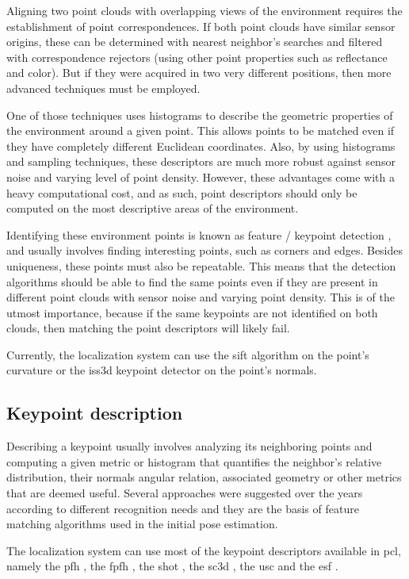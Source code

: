 Aligning two point clouds with overlapping views of the environment requires the establishment of point correspondences. If both point clouds have similar sensor origins, these can be determined with nearest neighbor's searches and filtered with correspondence rejectors (using other point properties such as reflectance and color). But if they were acquired in two very different positions, then more advanced techniques must be employed.

One of those techniques uses histograms to describe the geometric properties of the environment around a given point. This allows points to be matched even if they have completely different Euclidean coordinates. Also, by using histograms and sampling techniques, these descriptors are much more robust against sensor noise and varying level of point density. However, these advantages come with a heavy computational cost, and as such, point descriptors should only be computed on the most descriptive areas of the environment.

Identifying these environment points is known as feature / keypoint detection \cite{Filipe2014}, and usually involves finding interesting points, such as corners and edges. Besides uniqueness, these points must also be repeatable. This means that the detection algorithms should be able to find the same points even if they are present in different point clouds with sensor noise and varying point density. This is of the utmost importance, because if the same keypoints are not identified on both clouds, then matching the point descriptors will likely fail.

Currently, the localization system can use the \gls{sift} \cite{Lowe2004} algorithm on the point's curvature or the \gls{iss3d} \cite{Zhong2009} keypoint detector on the point's normals.


\subsection{Keypoint description}

Describing a keypoint usually involves analyzing its neighboring points and computing a given metric or histogram that quantifies the neighbor's relative distribution, their normals angular relation, associated geometry or other metrics that are deemed useful. Several approaches were suggested over the years according to different recognition needs and they are the basis of feature matching algorithms used in the initial pose estimation.

The localization system can use most of the keypoint descriptors available in \gls{pcl}, namely the \gls{pfh} \cite{Rusu2008a}, the \gls{fpfh} \cite{Rusu2009}, the \gls{shot} \cite{Tombari2011}, the \gls{sc3d} \cite{Frome2004}, the \gls{usc} \cite{Tombari2010} and the \gls{esf} \cite{Wohlkinger2011}.


